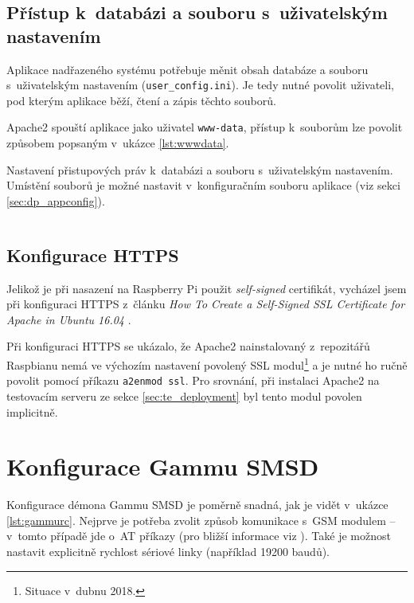 \newpage

\subsection{Přístup k~databázi a souboru s~uživatelským nastavením}

Aplikace nadřazeného systému potřebuje měnit obsah databáze a souboru s~uživatelským nastavením (\texttt{user\_config.ini}). Je tedy nutné povolit uživateli, pod kterým aplikace běží, čtení a zápis těchto souborů. 

Apache2 spouští aplikace jako uživatel \texttt{www-data}, přístup k~souborům lze povolit způsobem popsaným v~ukázce \ref{lst:wwwdata}.

\begin{listing}[htbp]
\caption{\label{lst:wwwdata} Nastavení přistupových práv k~databázi a souboru s~uživatelským nastavením. Umístění souborů je možné nastavit v~konfiguračním souboru aplikace (viz sekci \ref{sec:dp_appconfig}).}
\inputminted[bgcolor=codebg]{bash}{source-samples/wwwdata.sh}
\end{listing}

\subsection{Konfigurace HTTPS}

Jelikož je při nasazení na Raspberry Pi použit \textit{self-signed} certifikát, vycházel jsem při konfiguraci HTTPS z~článku \textit{How To Create a Self-Signed SSL Certificate for Apache in Ubuntu 16.04} \cite{digital_ocean_selfsigned}.

Při konfiguraci HTTPS se ukázalo, že Apache2 nainstalovaný z~repozitářů Raspbianu nemá ve výchozím nastavení povolený SSL modul\footnote{Situace v~dubnu 2018.} a je nutné ho ručně povolit pomocí příkazu \texttt{a2enmod ssl}. Pro srovnání, při instalaci Apache2 na testovacím serveru ze sekce \ref{sec:te_deployment} byl tento modul povolen implicitně.

\section{Konfigurace Gammu SMSD}

Konfigurace démona Gammu SMSD je poměrně snadná, jak je vidět v~ukázce \ref{lst:gammurc}. Nejprve je potřeba zvolit způsob komunikace s~GSM modulem -- v~tomto případě jde o~AT příkazy (pro bližší informace viz \cite{gsm_standard}). Také je možnost nastavit explicitně rychlost sériové linky (například 19200 baudů).

